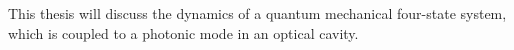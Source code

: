 This thesis will discuss the dynamics of a quantum mechanical four-state system, which is coupled
to a photonic mode in an optical cavity.